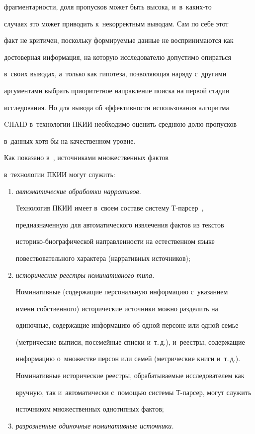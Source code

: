 фрагментарности, доля пропусков может быть высока, и~в~ка\-ких-то 


случаях это может приводить к~некорректным выводам. Сам по себе этот 


факт не критичен, поскольку формируемые данные не воспринимаются как 


достоверная информация, на которую исследователю допустимо опираться 


в~своих выводах, а~только как гипотеза, позволяющая наряду с~другими 


аргументами выбрать приоритетное направление поиска на первой стадии 


исследования. Но для вывода об эффективности использования алгоритма 


CHAID в~технологии ПКИИ необходимо оценить среднюю долю пропусков 


в~данных хотя бы на качественном уровне.


  


  Как показано в~\cite{6-ad}, источниками множественных фактов 


в~технологии ПКИИ могут служить:


  \begin{enumerate}[(1)]


  \item \textit{автоматические обработки нарративов.}


  


  Технология ПКИИ имеет в~своем составе систему Т-пар\-сер~\cite{11-ad}, 


предназначенную для автоматического извлечения фактов из текстов  


ис\-то\-ри\-ко-био\-гра\-фи\-че\-ской направленности на естественном языке 


повествовательного характера (нарративных источников);


  \item \textit{исторические реестры номинативного типа.}


  


  Номинативные (содержащие персональную информацию с~указанием 


имени собственного) исторические источники можно разделить на 


одиночные, содержащие информацию об одной персоне или одной семье 


(метрические выписи, посемейные списки и~т.\,д.), и~реестры, содержащие 


информацию о~множестве персон или семей (метрические книги и~т.\,д.). 


Номинативные исторические реестры, обрабатываемые исследователем как 


вручную, так и~автоматически с~помощью системы Т-пар\-сер, могут служить 


источником множественных однотипных фактов;


  \item \textit{разрозненные одиночные номинативные источники.}


  \end{enumerate}


